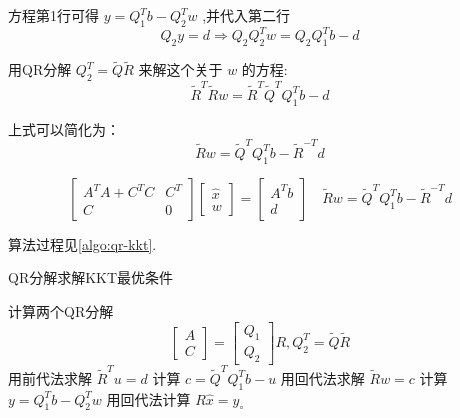 方程第1行可得 $ y=Q_{1}^{T} b-Q_{2}^{T} w $ ,并代入第二行
\begin{equation}
Q_{2} y=d \Rightarrow Q_{2} Q_{2}^{T} w=Q_{2} Q_{1}^{T} b-d
\end{equation}

用QR分解 $ Q_{2}^{T}=\tilde{Q} \tilde{R} $ 来解这个关于 $ w $ 的方程:
\begin{equation}
\tilde{R}^{T} \tilde{R} w=\tilde{R}^{T} \tilde{Q}^{T} Q_{1}^{T} b-d
\end{equation}

上式可以简化为：
\begin{equation}
\tilde{R} w=\tilde{Q}^{T} Q_{1}^{T} b-\tilde{R}^{-T} d
\end{equation}

\begin{equation} \left[\begin{array}{cc}A^{T} A+C^{T} C & C^{T} \\ C & 0\end{array}\right]\left[\begin{array}{c}\hat{x} \\ w\end{array}\right]=\left[\begin{array}{c}A^{T} b \\ d\end{array}\right] \quad \tilde{R} w=\tilde{Q}^{T} Q_{1}^{T} b-\tilde{R}^{-T} d \end{equation}

算法过程见\ref{algo:qr-kkt}.

\begin{algorithm}[htbp]
    \caption{QR分解求解KKT最优条件}
    \label{algo:qr-kkt}
    计算两个QR分解
\begin{equation}
\left[\begin{array}{l}
A\\
C
\end{array}\right]=\left[\begin{array}{l}
Q_{1} \\
Q_{2}
\end{array}\right] R, Q_{2}^{T}=\tilde{Q} \tilde{R}
\end{equation}\;
用前代法求解 $ \tilde{R}^{T} u=d $ \;
计算 $ c=\tilde{Q}^{T} Q_{1}^{T} b-u $\;
用回代法求解 $ \tilde{R} w=c $ \;
计算 $ y=Q_{1}^{T} b-Q_{2}^{T} w $\;
用回代法计算 $ R \hat{x}=y_{\circ} $\;

\end{algorithm}

